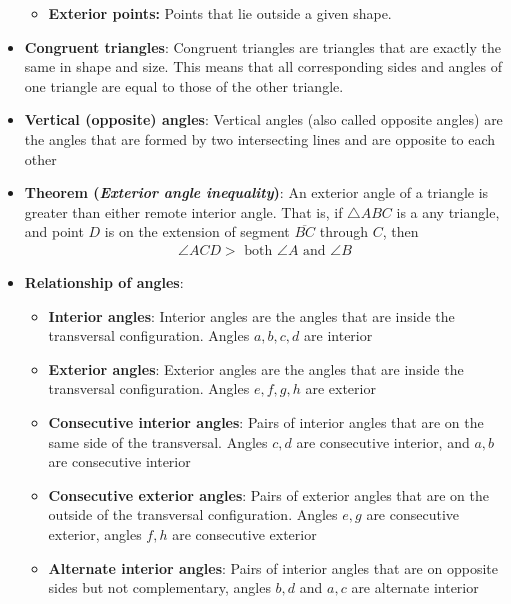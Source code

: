 \documentclass{report}
\begin{document}
\begin{itemize}
\begin{itemize}
                \item \textbf{Exterior points:} Points that lie outside a given shape.
            \end{itemize}
        \item \textbf{Congruent triangles}: Congruent triangles are triangles that are exactly the same in shape and size. This means that all corresponding sides and angles of one triangle are equal to those of the other triangle.
        \item \textbf{Vertical (opposite) angles}: Vertical angles (also called opposite angles) are the angles that are formed by two intersecting lines and are opposite to each other
        \item \textbf{Theorem (\textit{Exterior angle inequality})}: An exterior angle of a triangle is greater than either remote interior angle. That is, if $\triangle ABC$ is a any triangle, and point $D$ is on the extension of segment $\overline{BC}$ through $C$, then
            \begin{align*}
                \angle ACD > \text{ both } \angle A \text{ and } \angle B
            \end{align*}
        \item \textbf{Relationship of angles}:
            \bigbreak \noindent 
            \bigbreak \noindent 
            \begin{itemize}
                \item \textbf{Interior angles}: Interior angles are the angles that are inside the transversal configuration. Angles $a,b,c,d$ are interior
                \item \textbf{Exterior angles}: Exterior angles are the angles that are inside the transversal configuration. Angles $e,f,g,h$ are exterior
                \item \textbf{Consecutive interior angles}: Pairs of interior angles that are on the same side of the transversal. Angles $c,d$ are consecutive interior, and $a,b$ are consecutive interior
                \item \textbf{Consecutive exterior angles}: Pairs of exterior angles that are on the outside of the transversal configuration. Angles $e,g$ are consecutive exterior, angles $f,h$ are consecutive exterior
                \item \textbf{Alternate interior angles}: Pairs of interior angles that are on opposite sides but not complementary, angles $b,d$ and $a,c$ are alternate interior

\end{itemize}
\end{itemize}
\end{document}
